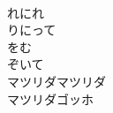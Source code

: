 \documentclass[10pt,b5j]{tarticle} %
\begin{document}
\begin{enumerate}
\begin{minipage}[c]{\blocksize}
    \end{minipage}
    \begin{minipage}[c]{\blocksize}
        
        \vspace{\linespace}
        \item~\\
        れにれ\\
        りにって\\
        をむ\\
        ぞいて\\
        マツリダマツリダ\\
        マツリダゴッホ
    
    \end{minipage}
\end{enumerate} %
\end{document}
